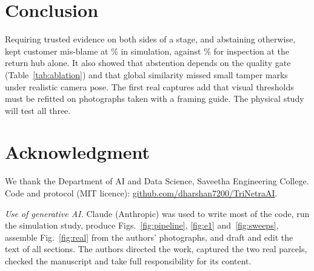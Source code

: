 \documentclass[conference]{IEEEtran}
\begin{document}
\section{Conclusion}
Requiring trusted evidence on both sides of a stage, and abstaining otherwise, kept customer mis-blame at \AlgMis\% in simulation, against \BoneMis\% for inspection at the return hub alone. It also showed that abstention depends on the quality gate (Table~\ref{tab:ablation}) and that global similarity missed small tamper marks under realistic camera pose. The first real captures add that visual thresholds must be refitted on photographs taken with a framing guide. The physical study will test all three.

\section*{Acknowledgment}
We thank the Department of AI and Data Science, Saveetha Engineering College. Code and protocol (MIT licence): \url{github.com/dharshan7200/TriNetraAI}.

\emph{Use of generative AI.} Claude (Anthropic) was used to write most of the code, run the simulation study, produce Figs.~\ref{fig:pipeline}, \ref{fig:e1} and~\ref{fig:sweeps}, assemble Fig.~\ref{fig:real} from the authors' photographs, and draft and edit the text of all sections. The authors directed the work, captured the two real parcels, checked the manuscript and take full responsibility for its content.

\balance


\end{document}
